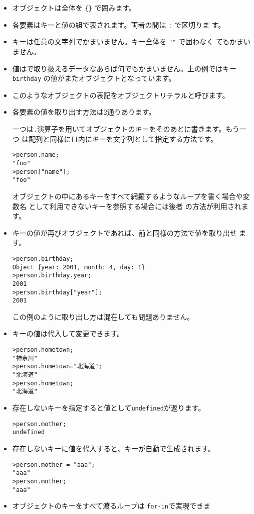 \begin{itemize}
 \item オブジェクトは全体を \Verb+{}+ で囲みます。
 \item 各要素はキーと値の組で表されます。両者の間は \Verb+:+ で区切りま
			 す。
 \item キーは任意の文字列でかまいません。キー全体を \Verb+""+ で囲わなく
			 てもかまいません。
 \item 値は\JS で取り扱えるデータなあらば何でもかまいません。上の例ではキー
       \Verb+birthday+ の値がまたオブジェクトとなっています。
 \item このようなオブジェクトの表記をオブジェクトリテラルと呼びます。
 \item 各要素の値を取り出す方法は2通りあります。

一つは\Verb+.+演算子を用いてオブジェクトのキーをそのあとに書きます。もう一つ
       は配列と同様に\Verb+[]+内にキーを文字列として指定する方法です。
\begin{Verbatim}
>person.name;
"foo"
>person["name"];
"foo"
\end{Verbatim}
オブジェクトの中にあるキーをすべて網羅するようなループを書く場合や変数名
       として利用できないキーを参照する場合には後者
       の方法が利用されます。
 \item キーの値が再びオブジェクトであれば、前と同様の方法で値を取り出せ
       ます。
\begin{Verbatim}[fontsize=\small]
>person.birthday;
Object {year: 2001, month: 4, day: 1}
>person.birthday.year;
2001
>person.birthday["year"];
2001
\end{Verbatim}
この例のように取り出し方は混在しても問題ありません。
 \item キーの値は代入して変更できます。
\begin{Verbatim}[fontsize=\small]
>person.hometown;
"神奈川"
>person.hometown="北海道";
"北海道"
>person.hometown;
"北海道"
\end{Verbatim}
 \item 存在しないキーを指定すると値として\Verb+undefined+が返ります。
\begin{Verbatim}[fontsize=\small]
>person.mother;
undefined
\end{Verbatim}
 \item 存在しないキーに値を代入すると、キーが自動で生成されます。
\begin{Verbatim}[fontsize=\small]
>person.mother = "aaa";
"aaa"
>person.mother;
"aaa"
\end{Verbatim}
 \item オブジェクトのキーをすべて渡るループは \verb+for-in+で実現できま

\end{itemize}
